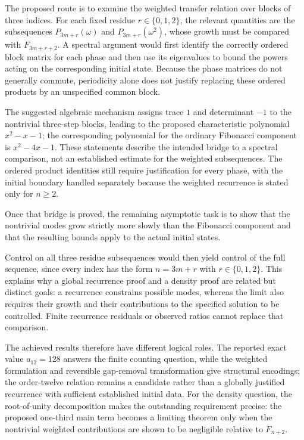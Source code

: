 \documentclass[11pt]{article}
\begin{document}
The proposed route is to examine the weighted transfer relation over blocks of three indices. For each fixed residue $r\in\{0,1,2\}$, the relevant quantities are the subsequences $P_{3m+r}(\omega)$ and $P_{3m+r}(\omega^2)$, whose growth must be compared with $F_{3m+r+2}$. A spectral argument would first identify the correctly ordered block matrix for each phase and then use its eigenvalues to bound the powers acting on the corresponding initial state. Because the phase matrices do not generally commute, periodicity alone does not justify replacing these ordered products by an unspecified common block.

The suggested algebraic mechanism assigns trace $1$ and determinant $-1$ to the nontrivial three-step blocks, leading to the proposed characteristic polynomial $x^2-x-1$; the corresponding polynomial for the ordinary Fibonacci component is $x^2-4x-1$. These statements describe the intended bridge to a spectral comparison, not an established estimate for the weighted subsequences. The ordered product identities still require justification for every phase, with the initial boundary handled separately because the weighted recurrence is stated only for $n\geq2$.

Once that bridge is proved, the remaining asymptotic task is to show that the nontrivial modes grow strictly more slowly than the Fibonacci component and that the resulting bounds apply to the actual initial states.

Control on all three residue subsequences would then yield control of the full sequence, since every index has the form $n=3m+r$ with $r\in\{0,1,2\}$. This explains why a global recurrence proof and a density proof are related but distinct goals: a recurrence constrains possible modes, whereas the limit also requires their growth and their contributions to the specified solution to be controlled. Finite recurrence residuals or observed ratios cannot replace that comparison.

The achieved results therefore have different logical roles. The reported exact value $a_{12}=128$ answers the finite counting question, while the weighted formulation and reversible gap-removal transformation give structural encodings; the order-twelve relation remains a candidate rather than a globally justified recurrence with sufficient established initial data. For the density question, the root-of-unity decomposition makes the outstanding requirement precise: the proposed one-third main term becomes a limiting theorem only when the nontrivial weighted contributions are shown to be negligible relative to $F_{n+2}$.
\end{document}
